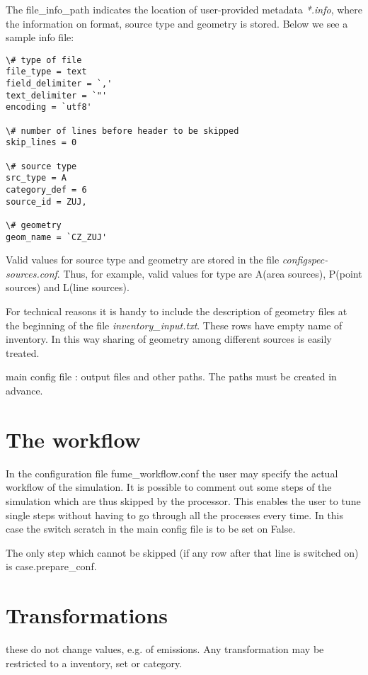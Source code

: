 \documentclass[a4paper,11pt]{article}
\begin{document}
The file\_info\_path indicates the location of user-provided metadata
\emph{*.info}, where the information on format, source type and geometry
is stored. Below we see a sample info file:

\begin{verbatim}
\# type of file 
file_type = text 
field_delimiter = `,' 
text_delimiter = `"' 
encoding = `utf8'

\# number of lines before header to be skipped 
skip_lines = 0

\# source type 
src_type = A
category_def = 6 
source_id = ZUJ,

\# geometry 
geom_name = `CZ_ZUJ'
\end{verbatim}

Valid values for source type and geometry are stored in the file
\emph{configspec-sources.conf}. Thus, for example, valid values for type
are A(area sources), P(point sources) and L(line sources).

For technical reasons it is handy to include the description of geometry
files at the beginning of the file \emph{inventory\_input.txt}. These
rows have empty name of inventory. In this way sharing of geometry among
different sources is easily treated.

main config file : output files and other paths. The paths must be
created in advance.


\section{The workflow}\label{the-workflow}

In the configuration file fume\_workflow.conf the user may specify the
actual workflow of the simulation. It is possible to comment out some
steps of the simulation which are thus skipped by the processor. This
enables the user to tune single steps without having to go through all
the processes every time. In this case the switch scratch in the main
config file is to be set on False.

The only step which cannot be skipped (if any row after that line is
switched on) is case.prepare\_conf.

\section{Transformations}\label{transformations}

these do not change values, e.g. of emissions. Any transformation may be
restricted to a inventory, set or category.
\end{document}
